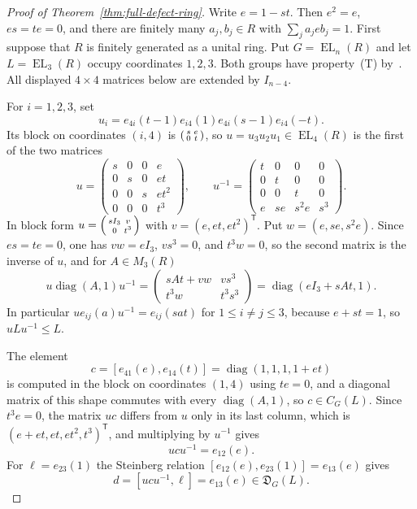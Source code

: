 \documentclass[11pt]{amsart}
\theoremstyle{plain}
\newcommand{\EL}{\operatorname{EL}}
\begin{document}
\begin{proof}[Proof of Theorem~\ref{thm:full-defect-ring}]
Write $e=1-st$.  Then $e^2=e$, $es=te=0$, and there are finitely many
$a_j,b_j\in R$ with $\sum_j a_jeb_j=1$.
First suppose that $R$ is finitely generated as a unital ring.
Put $G=\EL_n(R)$ and let $L=\EL_3(R)$ occupy coordinates $1,2,3$.
Both groups have property~\textup{(T)} by~\cite[Theorem~1.1]{EJZ}.
All displayed $4\times4$ matrices below are extended by $I_{n-4}$.

For $i=1,2,3$, set
\[
 u_i=e_{4i}(t-1)e_{i4}(1)e_{4i}(s-1)e_{i4}(-t).
\]
Its block on coordinates $(i,4)$ is
$\begin{psmallmatrix}s&e\\0&t\end{psmallmatrix}$, so
$u=u_3u_2u_1\in\EL_4(R)$ is the first of the two matrices
\[
 u=
 \begin{pmatrix}
 s&0&0&e\\
 0&s&0&et\\
 0&0&s&et^2\\
 0&0&0&t^3
 \end{pmatrix},
 \qquad
 u^{-1}=
 \begin{pmatrix}
 t&0&0&0\\
 0&t&0&0\\
 0&0&t&0\\
 e&se&s^2e&s^3
 \end{pmatrix}.
\]
In block form $u=\begin{psmallmatrix}sI_3&v\\0&t^3\end{psmallmatrix}$
with $v=(e,et,et^2)^{\mathsf T}$.  Put $w=(e,se,s^2e)$.  Since $es=te=0$,
one has $vw=eI_3$, $vs^3=0$, and $t^3w=0$, so the second matrix is the
inverse of $u$, and for $A\in M_3(R)$
\[
 u\operatorname{diag}(A,1)u^{-1}
   =\begin{pmatrix}sAt+vw&vs^3\\t^3w&t^3s^3\end{pmatrix}
   =\operatorname{diag}(eI_3+sAt,1).
\]
In particular $ue_{ij}(a)u^{-1}=e_{ij}(sat)$ for $1\le i\ne j\le3$,
because $e+st=1$, so $uLu^{-1}\le L$.

The element
\[
 c=[e_{41}(e),e_{14}(t)]
   =\operatorname{diag}(1,1,1,1+et)
\]
is computed in the block on coordinates $(1,4)$ using $te=0$, and a
diagonal matrix of this shape commutes with every
$\operatorname{diag}(A,1)$, so $c\in C_G(L)$.  Since $t^3e=0$, the
matrix $uc$ differs from $u$ only in its last column, which is
$(e+et,et,et^2,t^3)^{\mathsf T}$, and multiplying by $u^{-1}$ gives
\[
 ucu^{-1}=e_{12}(e).
\]
For $\ell=e_{23}(1)$ the Steinberg relation
$[e_{12}(e),e_{23}(1)]=e_{13}(e)$ gives
\[
 d=[ucu^{-1},\ell]=e_{13}(e)\in\mathfrak D_G(L).
\]


\end{proof}
\end{document}
